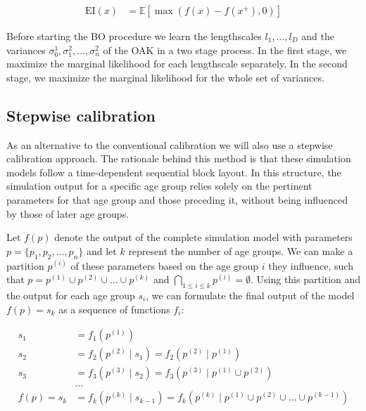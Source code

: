 \documentclass[sn-mathphys,Numbered]{sn-jnl}%
\begin{document}
\begin{equation} \label{eq:expected-improvement}
	\begin{aligned}
		\text{EI}(x) &= \mathbb{E}[\max(f(x)-f(x^+), 0)]
	\end{aligned}
\end{equation}

Before starting the BO procedure we learn the lengthscales $l_1, ..., l_D$ and the variances $\sigma_0^1, \sigma_1^2, ..., \sigma_n^2$ of the OAK in a two stage process. In the first stage, we maximize the marginal likelihood for each lengthscale separately. In the second stage, we maximize the marginal likelihood for the whole set of variances.

\subsection{Stepwise calibration}
As an alternative to the conventional calibration we will also use a stepwise calibration approach. The rationale behind this method is that these simulation models follow a time-dependent sequential block layout. In this structure, the simulation output for a specific age group relies solely on the pertinent parameters for that age group and those preceding it, without being influenced by those of later age groups.

Let $f(p)$ denote the output of the complete simulation model with parameters $p = \{p_1, p_2, ..., p_n\}$ and let $k$ represent the number of age groups. We can make a partition $p^{(i)}$ of these parameters based on the age group $i$ they influence, such that $p = p^{(1)} \cup p^{(2)} \cup ... \cup p^{(k)}$ and $\underset{1\leq i \leq k}{\bigcap} p^{(i)} = \emptyset$. Using this partition and the output for each age group $s_i$, we can formulate the final output of the model $f(p) = s_k$ as a sequence of functions $f_i$:

\begin{equation} \label{eq:stepwise-function}
	\begin{aligned}
		s_1 &= f_1(p^{(1)})  \\
		s_2 &= f_2(p^{(2)} \mid s_1)= f_2(p^{(2)} \mid p^{(1)}) \\
		s_3 &= f_3(p^{(3)} \mid s_2)= f_3(p^{(3)} \mid p^{(1)} \cup p^{(2)}) \\
		&\dots \\
		f(p) = s_k &= f_k(p^{(k)} \mid s_{k-1})= f_k(p^{(k)} \mid p^{(1)} \cup p^{(2)} \cup \dots \cup p^{(k-1)}) \\
	\end{aligned}
\end{equation}	
\end{document}
